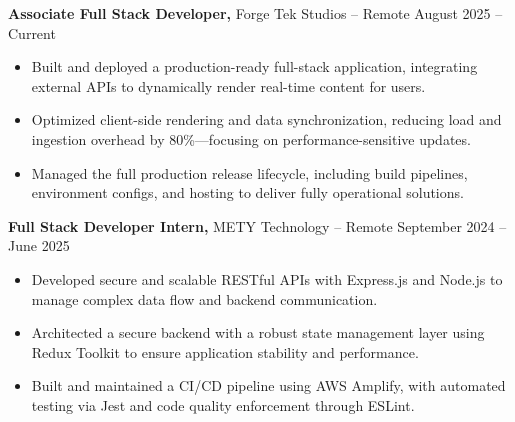 \documentclass[11pt]{article}       %
\begin{document}
\textbf{Associate Full Stack Developer,} {Forge Tek Studios} -- Remote \hfill August 2025 -- Current \\
\vspace{-9pt}
\begin{itemize}
  \item Built and deployed a production-ready full-stack application, integrating external APIs to dynamically render real-time content for users.
  \item Optimized client-side rendering and data synchronization, reducing load and ingestion overhead by 80\%—focusing on performance-sensitive updates.
  \item Managed the full production release lifecycle, including build pipelines, environment configs, and hosting to deliver fully operational solutions.
\end{itemize}

\textbf{Full Stack Developer Intern,} {METY Technology} -- Remote \hfill September 2024 -- June 2025 \\
\vspace{-9pt}
\begin{itemize}
  \item Developed secure and scalable RESTful APIs with Express.js and Node.js to manage complex data flow and backend communication.
  \item Architected a secure backend with a robust state management layer using Redux Toolkit to ensure application stability and performance.
  \item Built and maintained a CI/CD pipeline using AWS Amplify, with automated testing via Jest and code quality enforcement through ESLint.
\end{itemize}
\end{document}
